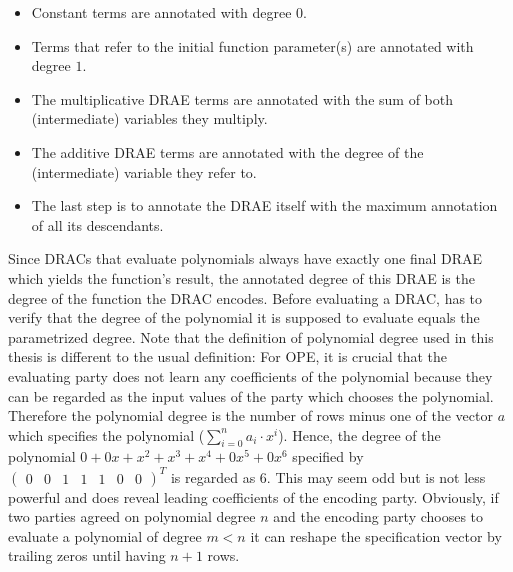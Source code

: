 \begin{itemize}

  \item Constant terms are annotated with degree $0$.

  \item Terms that refer to the initial function parameter(s) are annotated with
    degree $1$.

  \item The multiplicative DRAE terms are annotated with the sum of both
    (intermediate) variables they multiply.

  \item The additive DRAE terms are annotated with the degree of the
    (intermediate) variable they refer to.

  \item The last step is to annotate the DRAE itself with the maximum annotation
    of all its descendants.

\end{itemize}

\noindent{}Since DRACs that evaluate polynomials always have exactly one final
DRAE which yields the function's result, the annotated degree of this DRAE is
the degree of the function the DRAC encodes. Before evaluating a DRAC, \JWpTwo{}
has to verify that the degree of the polynomial it is supposed to evaluate
equals the parametrized degree. Note that the definition of polynomial degree
used in this thesis is different to the usual definition: For OPE, it
is crucial that the evaluating party does not learn any coefficients of the
polynomial because they can be regarded as the input values of the party which
chooses the polynomial. Therefore the polynomial degree is the number of rows
minus one of the vector $a$ which specifies the polynomial ($\sum_{i=0}^n
a_i\cdot x^i$). Hence, the degree of the polynomial $0 + 0x + x^2 + x^3 + x^4 +
0x^5 + 0x^6$ specified by $\begin{pmatrix}0&0&1&1&1&0&0\end{pmatrix}^T$ is
regarded as $6$. This may seem odd but is not less powerful and does reveal
leading coefficients of the encoding party. Obviously, if two parties agreed on
polynomial degree $n$ and the encoding party chooses to evaluate a polynomial of
degree $m < n$ it can reshape the specification vector by trailing zeros until
having $n+1$ rows.

